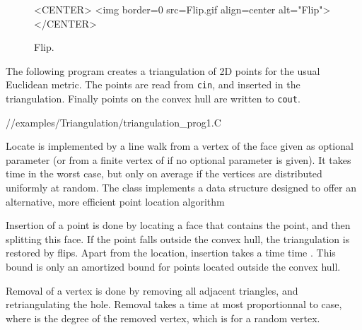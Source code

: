 \begin{figure}
\begin{ccTexOnly}
\begin{center} %

\end{center}
\end{ccTexOnly} 
\caption{Flip.
\label{I1_fig_flip_bis}}

\begin{ccHtmlOnly}
<CENTER>
<img border=0 src=Flip.gif align=center alt="Flip">
</CENTER>
\end{ccHtmlOnly} 
\end{figure}











\ccExample

The following program  creates a  triangulation of 2D points
for the  usual Euclidean metric. The points are read from {\tt cin},
and inserted in the triangulation.
Finally points on the convex hull are written to {\tt cout}. 

//examples/Triangulation/triangulation\_prog1.C



Locate is implemented by a line walk from a vertex of the face given
as optional parameter (or from a finite vertex of
 if no optional parameter is given). It takes
time  in the worst case, but only 
on average if the vertices are distributed uniformly at random.
The class  
implements a data structure  designed to
offer an alternative, more efficient point location algorithm

Insertion of a point is done by locating a face that contains the
point, and then splitting this face.
If the point falls outside the convex hull, the triangulation
 is restored by flips.  Apart from the location, insertion takes a time 
time . This bound is only an amortized bound
for points located outside the convex hull.

Removal of a vertex is done by removing all adjacent triangles, and
retriangulating the hole. Removal takes a time  at most proportionnal to
 case, where
  is the degree of the removed vertex,
which is  for a random vertex.

